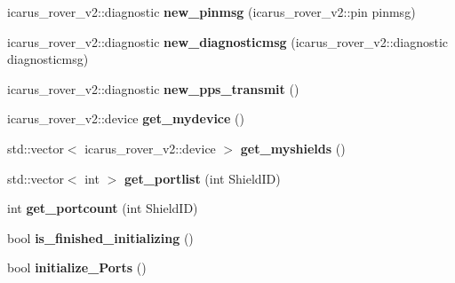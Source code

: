 \begin{DoxyCompactItemize}
\item 
\mbox{\label{classBoardControllerNodeProcess_a80114c292d0839fd36ce1260a0f30263}} 
icarus\+\_\+rover\+\_\+v2\+::diagnostic {\bfseries new\+\_\+pinmsg} (icarus\+\_\+rover\+\_\+v2\+::pin pinmsg)
\item 
\mbox{\label{classBoardControllerNodeProcess_a0998796249b57b22cf2eb457776a1523}} 
icarus\+\_\+rover\+\_\+v2\+::diagnostic {\bfseries new\+\_\+diagnosticmsg} (icarus\+\_\+rover\+\_\+v2\+::diagnostic diagnosticmsg)
\item 
\mbox{\label{classBoardControllerNodeProcess_a26cfe590f4a1e8b3243876f61fc9167c}} 
icarus\+\_\+rover\+\_\+v2\+::diagnostic {\bfseries new\+\_\+pps\+\_\+transmit} ()
\item 
\mbox{\label{classBoardControllerNodeProcess_a821a6101e2ee663b30e142807d4340a0}} 
icarus\+\_\+rover\+\_\+v2\+::device {\bfseries get\+\_\+mydevice} ()
\item 
\mbox{\label{classBoardControllerNodeProcess_aca75c3e3fe1f41c8cdf0a812bb236dde}} 
std\+::vector$<$ icarus\+\_\+rover\+\_\+v2\+::device $>$ {\bfseries get\+\_\+myshields} ()
\item 
\mbox{\label{classBoardControllerNodeProcess_a1abb39b5e18ea74679db5f51b08df0c2}} 
std\+::vector$<$ int $>$ {\bfseries get\+\_\+portlist} (int Shield\+ID)
\item 
\mbox{\label{classBoardControllerNodeProcess_a8ed86cebb2279a56253c070b090134d6}} 
int {\bfseries get\+\_\+portcount} (int Shield\+ID)
\item 
\mbox{\label{classBoardControllerNodeProcess_aedc8107e2b147f22e12102266e3df2ac}} 
bool {\bfseries is\+\_\+finished\+\_\+initializing} ()
\item 
\mbox{\label{classBoardControllerNodeProcess_ad257ddf48ecdfa4aaa3823240c901364}} 
bool {\bfseries initialize\+\_\+\+Ports} ()
\item 

\end{DoxyCompactItemize}
